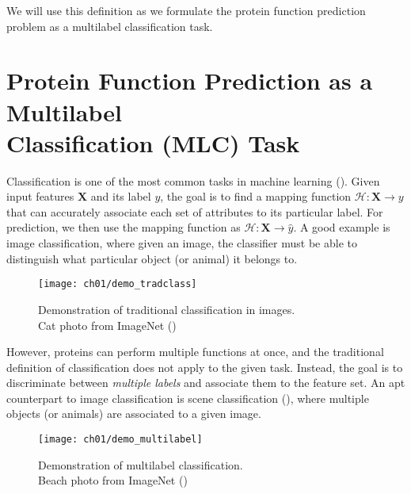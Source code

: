 \par We will use this definition as we formulate the protein function
prediction problem as a multilabel classification task.


\section[Protein Function Prediction as a Multilabel Classification Task]
{Protein Function Prediction as a Multilabel\\Classification  (MLC) Task}
\label{MultilabelClassification}

\par Classification is one of the most common tasks in machine learning
(\cite{herrera2016multilabel}). Given input features $\mathbf{X}$ and its
label $y$, the goal is to find a mapping function $\mathcal{H}: \mathbf{X}
\rightarrow y$ that can accurately associate each set of attributes to its
particular label. For prediction, we then use the mapping function as
$\mathcal{H}: \mathbf{X} \rightarrow \widehat{y}$. A good example is image
classification, where given an image, the classifier must be able to
distinguish what particular object (or animal) it belongs to.

\begin{figure}[!h]
  \centering
  \texttt{[image: ch01/demo\_tradclass]}
  \caption[Demonstration of traditional classification in images]
  {Demonstration of traditional classification in images.\\Cat photo
  from ImageNet (\cite{russakovsky2015imagenet})}
  \label{demo:traditional}
\end{figure}

\par However, proteins can perform multiple functions at once, and the
traditional definition of classification does not apply to the given task.
Instead, the goal is to discriminate between \textit{multiple labels} and
associate them to the feature set. An apt counterpart to image classification
is scene classification (\cite{boutell2004learning}), where multiple objects
(or animals) are associated to a given image.

\begin{figure}[!h]
  \centering
  \texttt{[image: ch01/demo\_multilabel]}
  \caption[Demonstration of multilabel classification]
  {Demonstration of multilabel classification.\\Beach photo
  from ImageNet (\cite{russakovsky2015imagenet})}
  \label{demo:multilabel}
\end{figure}

